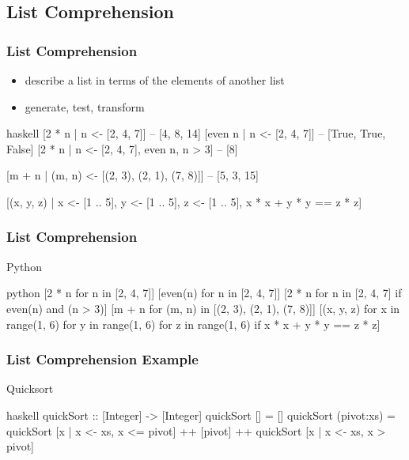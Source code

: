 \documentclass[dvipsnames]{beamer}
\theoremstyle{plain}
\begin{document}
\subsection{List Comprehension}

\begin{frame}[fragile]
  \frametitle{List Comprehension}

  \begin{itemize}
    \item describe a list in terms of the elements of another list
    \item generate, test, transform
  \end{itemize}

  \begin{exampleblock}{}
    \begin{pygments}{haskell}
[2 * n | n <- [2, 4, 7]]  -- [4, 8, 14]
[even n | n <- [2, 4, 7]] -- [True, True, False]
[2 * n | n <- [2, 4, 7], even n, n > 3]  -- [8]

[m + n | (m, n) <- [(2, 3), (2, 1), (7, 8)]]
-- [5, 3, 15]

[(x, y, z) | x <- [1 .. 5],
             y <- [1 .. 5],
             z <- [1 .. 5],
             x * x + y * y == z * z]
    \end{pygments}
  \end{exampleblock}
\end{frame}

\begin{frame}[fragile]
  \frametitle{List Comprehension}

  \begin{exampleblock}{Python}
    \begin{pygments}{python}
[2 * n for n in [2, 4, 7]]
[even(n) for n in [2, 4, 7]]
[2 * n for n in [2, 4, 7] if even(n) and (n > 3)]
[m + n for (m, n) in [(2, 3), (2, 1), (7, 8)]]
[(x, y, z) for x in range(1, 6)
           for y in range(1, 6)
           for z in range(1, 6)
           if x * x + y * y == z * z]
    \end{pygments}
  \end{exampleblock}
\end{frame}

\begin{frame}[fragile]
  \frametitle{List Comprehension Example}

  \begin{exampleblock}{Quicksort}
    \begin{pygments}{haskell}
quickSort :: [Integer] -> [Integer]
quickSort []         = []
quickSort (pivot:xs) =
    quickSort [x | x <- xs, x <= pivot]
    ++ [pivot]
    ++ quickSort [x | x <- xs, x > pivot]
    \end{pygments}
  \end{exampleblock}
\end{frame}
\end{document}

